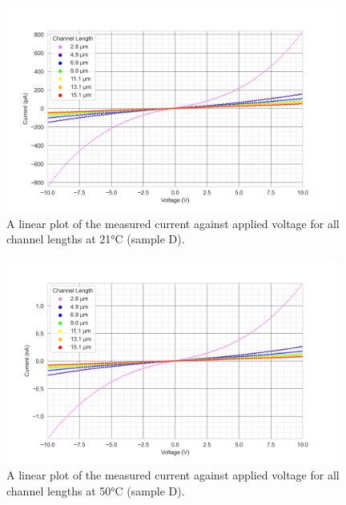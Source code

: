 \label{app:I_V_sample_D_10V}
\begin{figure}[h]
    \centering
    \includegraphics[width=0.97\textwidth]{Chapter3/Figs/Raster/Sample D 2019/IV/10V IV characteristics at 21 C.png}
    \caption{A linear plot of the measured current against applied voltage for all channel lengths at 21\si{\degreeCelsius} (sample D).}
    \label{appfig:D_current_voltage_21_10V}
\end{figure}
\begin{figure}[h]
    \centering
    \includegraphics[width=0.97\textwidth]{Chapter3/Figs/Raster/Sample D 2019/IV/10V IV characteristics at 50 C.png}
    \caption{A linear plot of the measured current against applied voltage for all channel lengths at 50\si{\degreeCelsius} (sample D).}
    \label{appfig:D_current_voltage_50_10V}
\end{figure}
